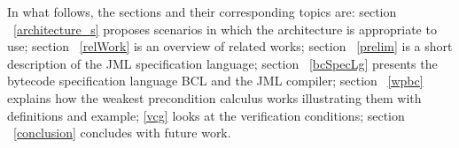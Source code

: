 In what follows, the sections and their corresponding topics are: 
section ~\ref{architecture_s} proposes scenarios in which the architecture is appropriate to use; section ~\ref{relWork} is an overview of related works; 
section  ~\ref{prelim} is a short description of the JML specification language; section ~\ref{bcSpecLg} presents the bytecode specification language BCL and the JML compiler; section ~\ref{wpbc} explains how the weakest precondition calculus works illustrating them with definitions and example; \ref{vcg} looks at the verification conditions; section ~\ref{conclusion} concludes with future work.  















